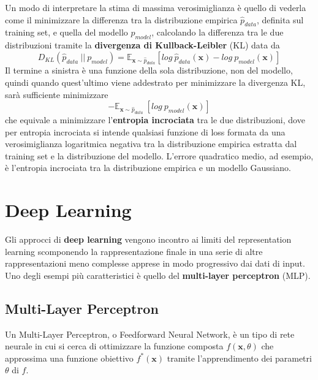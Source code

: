 \documentclass[12pt,a4paper]{report}
\begin{document}
    Un modo di interpretare la stima di massima verosimiglianza \`e 
    quello di vederla come il minimizzare la differenza tra la 
    distribuzione empirica $\hat{p}_{data}$, definita sul training set,
    e quella del modello $p_{model}$, calcolando la differenza tra le 
    due distribuzioni tramite la \textbf{divergenza di Kullback-Leibler}
    (KL) data da
    \begin{equation}
        D_{KL}(\hat{p}_{data}\ ||\ p_{model}) = \mathbb{E}_{\textbf{x}\sim\hat{p}_{data}}[log\ \hat{p}_{data}(\textbf{x})-log\ p_{model}(\textbf{x})]
    \end{equation}
    Il termine a sinistra \`e una funzione della sola distribuzione, non
    del modello, quindi quando quest'ultimo viene addestrato per
    minimizzare la divergenza KL, sar\`a sufficiente minimizzare
    \begin{equation}
        -\mathbb{E}_{\textbf{x}\sim\hat{p}_{data}}\ [log\ p_{model}(\textbf{x})]
    \end{equation}
    che equivale a minimizzare l'\textbf{entropia incrociata} tra le due
    distribuzioni, dove per entropia incrociata si intende qualsiasi 
    funzione di loss formata da una verosimiglianza logaritmica negativa
    tra la distribuzione empirica estratta dal training set e la 
    distribuzione del modello. L'errore quadratico medio, ad esempio,
    \`e l'entropia incrociata tra la distribuzione empirica e un modello
    Gaussiano.
    
    \section{Deep Learning}
    Gli approcci di \textbf{deep learning} vengono incontro ai limiti
    del representation learning scomponendo la rappresentazione
    finale in una serie di altre rappresentazioni meno complesse 
    apprese in modo progressivo dai dati di input. Uno degli esempi 
    pi\`u caratteristici \`e quello del \textbf{multi-layer perceptron} 
    (MLP).
    
    \subsection{Multi-Layer Perceptron} \label{sec:mlp}
    Un Multi-Layer Perceptron, o Feedforward Neural Network, \`e un
    tipo di rete neurale in cui si cerca di ottimizzare la funzione
    composta $f(\textbf{x}, \theta)$ che approssima una funzione 
    obiettivo $f^*(\textbf{x})$ tramite l'apprendimento dei 
    parametri $\theta$ di $f$. 
    
\end{document}
